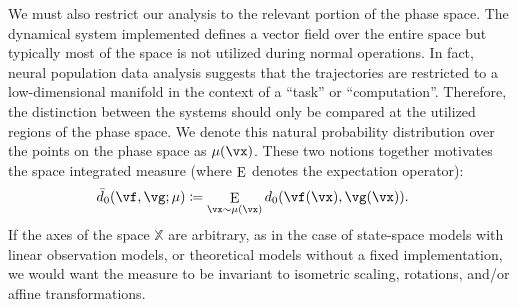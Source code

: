\documentclass{article}
\theoremstyle{definition} \newtheorem{definition}{Definition}  \newtheorem{example}{Example}
\theoremstyle{remark} \newtheorem{remark}{Remark}
\newcounter{ct}
\DeclareMathOperator*{\E}{\rm E} %
\newcommand{\inputSpace}{\mathbb{X}}
\newcommand{\initDist}{\mu} %
\begin{document}
We must also restrict our analysis to the relevant portion of the phase space.
The dynamical system implemented defines a vector field over the entire space but typically most of the space is not utilized during normal operations.
In fact, neural population data analysis suggests that the trajectories are restricted to a low-dimensional manifold in the context of a ``task'' or  ``computation''.
Therefore, the distinction between the systems should only be compared at the utilized regions of the phase space.
We denote this natural probability distribution over the points on the phase space as $\initDist(\vx)$.
%
These two notions together motivates the space integrated measure (where $\E$ denotes the expectation operator):
\begin{align}
    \bar{d}_{0}(\vf, \vg; \initDist)
	&\coloneq
	    \E_{\vx \sim \initDist(\vx)}
		d_0(\vf(\vx), \vg(\vx)).
	\label{eq:ed0}
\end{align}
%
If the axes of the space $\inputSpace$ are arbitrary, as in the case of state-space models with linear observation models, or theoretical models without a fixed implementation, we would want the measure to be invariant to isometric scaling, rotations, and/or affine transformations.
\end{document}
